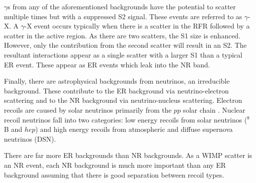 \par
$\gamma$s from any of the aforementioned backgrounds have the potential to scatter multiple times but with a suppressed S2 signal.
These events are referred to as $\gamma$-X.
A $\gamma$-X event occurs typically when there is a scatter in the RFR followed by a scatter in the active region.
As there are two scatters, the S1 size is enhanced.
However, only the contribution from the second scatter will result in an S2.
The resultant interactions appear as a single scatter with a larger S1 than a typical ER event.
These appear as ER events which leak into the NR band.


\par
Finally, there are astrophysical backgrounds from neutrinos, an irreducible background.%
These contribute to the ER background via neutrino-electron scattering and to the NR background via neutrino-nucleus scattering.
Electron recoils are caused by solar neutrinos primarily from the $pp$ solar chain \cite{solar_neutrinos_ref}.
Nuclear recoil neutrinos fall into two categories: low energy recoils from solar neutrinos ($^{8}$B and $hep$) and high energy recoils from atmospheric and diffuse supernova neutrinos (DSN).

\par
There are far more ER backgrounds than NR backgrounds.
As a WIMP scatter is an NR event, each NR background is much more important than any ER background assuming that there is good separation between recoil types.

